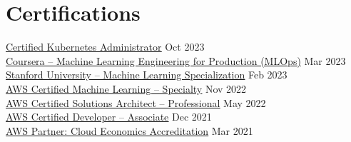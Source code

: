 \documentclass[letterpaper,11pt]{article}
\begin{document}
\section{Certifications}
 \begin{itemize}[leftmargin=0.15in, label={}]
    \small{\item{
     \href{https://www.credly.com/badges/7d05e153-7ef7-4d11-9730-408b166b6ba5/public_url}{\underline{Certified Kubernetes Administrator}} \hfill Oct 2023 \\
     \href{https://www.coursera.org/account/accomplishments/specialization/certificate/2KXDWZY9AS3L}{\underline{Coursera -- Machine Learning Engineering for Production (MLOps)}} \hfill Mar 2023 \\
     \href{https://www.coursera.org/account/accomplishments/specialization/certificate/XY86VFD9C8EG}{\underline{Stanford University -- Machine Learning Specialization}} \hfill Feb 2023 \\
     \href{https://www.credly.com/badges/b457396a-6c1b-42f5-aadc-fd8bdfbd5556/linked_in_profile}{\underline{AWS Certified Machine Learning -- Specialty}} \hfill Nov 2022 \\
     \href{https://www.credly.com/badges/7e969bbd-83ea-4dbe-9cb4-9d64c7ee907d?source=linked_in_profile}{\underline{AWS Certified Solutions Architect -- Professional}} \hfill May 2022 \\
     \href{https://www.credly.com/badges/30695c71-903b-42c9-a298-21b7e8989a9a?source=linked_in_profile}{\underline{AWS Certified Developer -- Associate}} \hfill Dec 2021 \\
     \href{https://www.credly.com/badges/393cd15e-5862-4d80-b3e5-429d2ab2b174?source=linked_in_profile}{\underline{AWS Partner: Cloud Economics Accreditation}} \hfill Mar 2021 \\
    }}
 \end{itemize}


\end{document}
